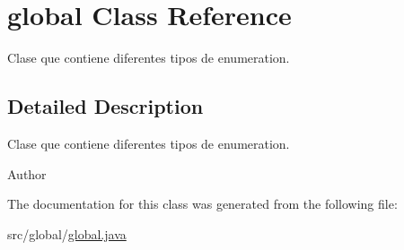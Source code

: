 \hypertarget{classglobal}{}\section{global Class Reference}
\label{classglobal}


Clase que contiene diferentes tipos de enumeration.  




\subsection{Detailed Description}
Clase que contiene diferentes tipos de enumeration. 

\begin{DoxyAuthor}{Author}

\end{DoxyAuthor}


The documentation for this class was generated from the following file\+:\begin{DoxyCompactItemize}
\item 
src/global/\hyperlink{global_8java}{global.\+java}\end{DoxyCompactItemize}
